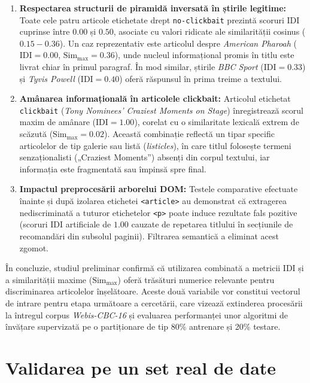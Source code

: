 \documentclass[12pt, a4paper]{article}
\begin{document}
\begin{enumerate}
    \item \textbf{Respectarea structurii de piramidă inversată în știrile legitime:} Toate cele patru articole etichetate drept \texttt{no-clickbait} prezintă scoruri IDI cuprinse între $0.00$ și $0.50$, asociate cu valori ridicate ale similarității cosinus ($0.15 - 0.36$). Un caz reprezentativ este articolul despre \textit{American Pharoah} ($\text{IDI} = 0.00$, $\text{Sim}_{\max} = 0.36$), unde nucleul informațional promis în titlu este livrat chiar în primul paragraf. În mod similar, știrile \textit{BBC Sport} ($\text{IDI} = 0.33$) și \textit{Tyvis Powell} ($\text{IDI} = 0.40$) oferă răspunsul în prima treime a textului.
    \item \textbf{Amânarea informațională în articolele clickbait:} Articolul etichetat \texttt{clickbait} (\textit{Tony Nominees' Craziest Moments on Stage}) înregistrează scorul maxim de amânare ($\text{IDI} = 1.00$), corelat cu o similaritate lexicală extrem de scăzută ($\text{Sim}_{\max} = 0.02$). Această combinație reflectă un tipar specific articolelor de tip galerie sau listă (\textit{listicles}), în care titlul folosește termeni senzaționalisti („Craziest Moments”) absenți din corpul textului, iar informația este fragmentată sau împinsă spre final.
    \item \textbf{Impactul preprocesării arborelui DOM:} Testele comparative efectuate înainte și după izolarea etichetei \texttt{<article>} au demonstrat că extragerea nediscriminată a tuturor etichetelor \texttt{<p>} poate induce rezultate fals pozitive (scoruri IDI artificiale de $1.00$ cauzate de repetarea titlului în secțiunile de recomandări din subsolul paginii). Filtrarea semantică a eliminat acest zgomot.
\end{enumerate}

În concluzie, studiul preliminar confirmă că utilizarea combinată a metricii IDI și a similarității maxime ($\text{Sim}_{\max}$) oferă trăsături numerice relevante pentru discriminarea articolelor înșelătoare. Aceste două variabile vor constitui vectorul de intrare pentru etapa următoare a cercetării, care vizează extinderea procesării la întregul corpus \textit{Webis-CBC-16} și evaluarea performanței unor algoritmi de învățare supervizată pe o partiționare de tip 80\% antrenare și 20\% testare.


\section{Validarea pe un set real de date}
\end{document}
